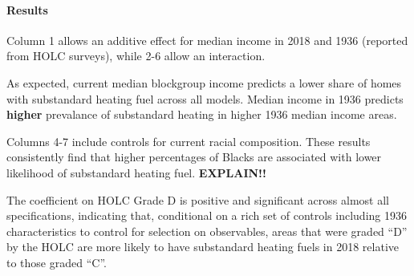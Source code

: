\documentclass[
]{article}
\begin{document}
\hypertarget{results}{%
\paragraph{Results}\label{results}}

Column 1 allows an additive effect for median income in 2018 and 1936
(reported from HOLC surveys), while 2-6 allow an interaction.

As expected, current median blockgroup income predicts a lower share of
homes with substandard heating fuel across all models. Median income in
1936 predicts \textbf{higher} prevalance of substandard heating in
higher 1936 median income areas.

Columns 4-7 include controls for current racial composition. These
results consistently find that higher percentages of Blacks are
associated with lower likelihood of substandard heating fuel.
\textbf{EXPLAIN!!}

The coefficient on HOLC Grade D is positive and significant across
almost all specifications, indicating that, conditional on a rich set of
controls including 1936 characteristics to control for selection on
observables, areas that were graded ``D'' by the HOLC are more likely to
have substandard heating fuels in 2018 relative to those graded ``C''.
\end{document}
